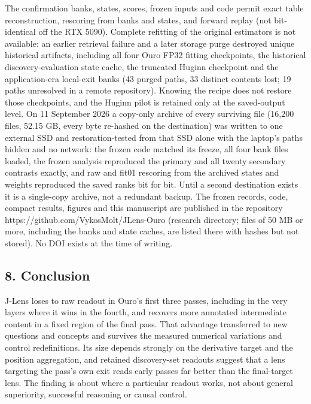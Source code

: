 \documentclass[
  british,
  11pt,
  a4paper,
]{article}
\begin{document}
The confirmation banks, states, scores, frozen inputs and code permit
exact table reconstruction, rescoring from banks and states, and forward
replay (not bit-identical off the RTX 5090). Complete refitting of the
original estimators is not available: an earlier retrieval failure and a
later storage purge destroyed unique historical artifacts, including all
four Ouro FP32 fitting checkpoints, the historical discovery-evaluation
state cache, the truncated Huginn checkpoint and the application-era
local-exit banks (43 purged paths, 33 distinct contents lost; 19 paths
unresolved in a remote repository). Knowing the recipe does not restore
those checkpoints, and the Huginn pilot is retained only at the
saved-output level. On 11 September 2026 a copy-only archive of every
surviving file (16,200 files, 52.15 GB, every byte re-hashed on the
destination) was written to one external SSD and restoration-tested from
that SSD alone with the laptop's paths hidden and no network: the frozen
code matched its freeze, all four bank files loaded, the frozen analysis
reproduced the primary and all twenty secondary contrasts exactly, and
raw and fit01 rescoring from the archived states and weights reproduced
the saved ranks bit for bit. Until a second destination exists it is a
single-copy archive, not a redundant backup. The frozen records, code,
compact results, figures and this manuscript are published in the
repository https://github.com/VykosMolt/JLens-Ouro (research directory;
files of 50 MB or more, including the banks and state caches, are listed
there with hashes but not stored). No DOI exists at the time of writing.

\subsection{8. Conclusion}\label{conclusion}

J-Lens loses to raw readout in Ouro's first three passes, including in
the very layers where it wins in the fourth, and recovers more annotated
intermediate content in a fixed region of the final pass. That advantage
transferred to new questions and concepts and survives the measured
numerical variations and control redefinitions. Its size depends
strongly on the derivative target and the position aggregation, and
retained discovery-set readouts suggest that a lens targeting the pass's
own exit reads early passes far better than the final-target lens. The
finding is about where a particular readout works, not about general
superiority, successful reasoning or causal control.
\end{document}
